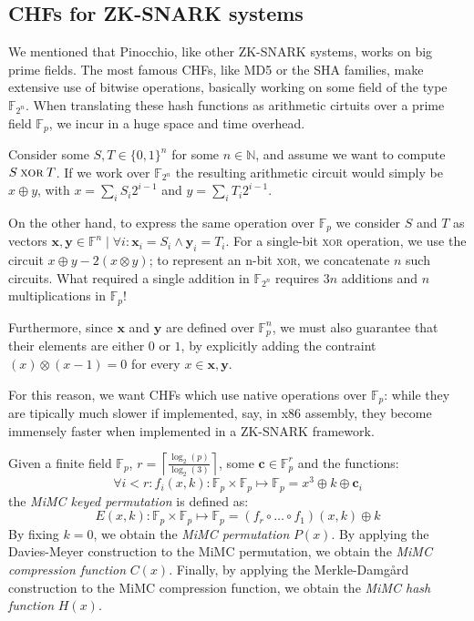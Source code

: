 \subsection{CHFs for ZK-SNARK systems}
We mentioned that Pinocchio, like other ZK-SNARK systems, works on big prime fields.
The most famous CHFs, like MD5 or the SHA families, make extensive use of bitwise operations,
basically working on some field of the type \(\mathbb{F}_{2^n}\).
When translating these hash functions as arithmetic cirtuits over a prime field \(\mathbb{F}_p\),
we incur in a huge space and time overhead.
\begin{example}
	Consider some \(S, T \in {\{0, 1\}}^n\) for some \(n \in \mathbb{N}\), and assume we want to
	compute \(S \mathbin{\textsc{xor}} T\).
	If we work over \(\mathbb{F}_{2^n}\) the resulting arithmetic circuit would simply be
	\(x \oplus y\), with \(x = \sum_{i}{S_{i}2^{i-1}}\) and \(y = \sum_{i}{T_{i}2^{i-1}}\).

	On the other hand, to express the same operation over \(\mathbb{F}_p\) we consider \(S\) and
	\(T\) as vectors
	\(\bm{x}, \bm{y} \in \mathbb{F}^n \mid \forall i\colon \bm{x}_i = S_i \wedge \bm{y}_i = T_i\).
	For a single-bit \textsc{xor} operation, we use the circuit \(x \oplus y - 2(x \otimes y) \);
	to represent an n-bit \textsc{xor}, we concatenate \(n\) such circuits.
	What required a single addition in \(\mathbb{F}_{2^n}\) requires \(3n\) additions and \(n\)
	multiplications in \(\mathbb{F}_p\)!

	Furthermore, since \(\bm{x}\) and \(\bm{y}\) are defined over \(\mathbb{F}_p^n\), we must also
	guarantee that their elements are either \(0\) or \(1\), by explicitly adding the contraint
	\((x)\otimes(x - 1) = 0\) for every \(x \in \bm{x}, \bm{y}\).
\end{example}

For this reason, we want CHFs which use native operations over \(\mathbb{F}_p\):
while they are tipically much slower if implemented, say, in x86 assembly, they become
immensely faster when implemented in a ZK-SNARK framework.

\begin{definition}
	Given a finite field \(\mathbb{F}_p\), 
  \(r = \left\lceil{\frac{\log_2(p)}{\log_2(3)}}\right\rceil \), some \(\bm{c} \in \mathbb{F}_p^r\) 
  and the functions:
	\[\forall i < r\colon f_i(x,k)\colon \mathbb{F}_p \times \mathbb{F}_p \mapsto \mathbb{F}_p =
		x^3 \oplus k \oplus \bm{c}_i\]
	the \emph{MiMC keyed permutation} is defined as:
	\[E(x, k)\colon \mathbb{F}_p \times \mathbb{F}_p \mapsto \mathbb{F}_p =
		(f_{r} \circ \dots \circ f_1)(x, k) \oplus k\]
	By fixing \(k = 0\), we obtain the \emph{MiMC permutation} \(P(x)\).
	By applying the Davies-Meyer construction to the MiMC permutation, we obtain the
	\emph{MiMC compression function} \(C(x)\).
	Finally, by applying the Merkle-Damg\r{a}rd construction to the MiMC compression function, we
	obtain the \emph{MiMC hash function} \(H(x)\).
\end{definition}

